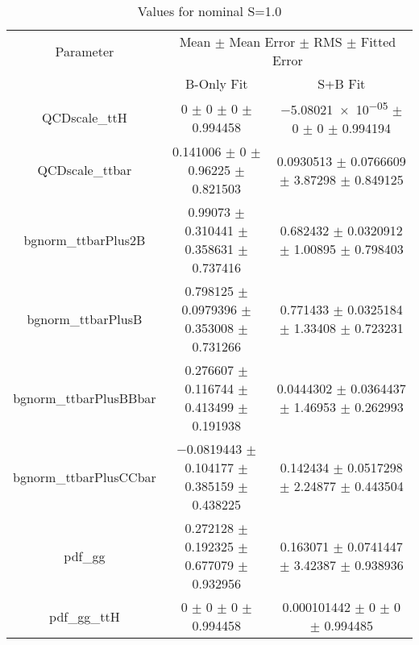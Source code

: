 \begin{table}
\centering
\caption{Values for nominal S=1.0}
\begin{tabular}{ccc}
\toprule
Parameter & \multicolumn{2}{c}{Mean $\pm$ Mean Error $\pm$ RMS $\pm$ Fitted Error}\\
 & B-Only Fit & S+B Fit\\
\midrule
QCDscale\_ttH & \num{0} $\pm$ \num{0} $\pm$ \num{0} $\pm$ \num{0.994458} & \num{-5.08021e-05} $\pm$ \num{0} $\pm$ \num{0} $\pm$ \num{0.994194}\\
QCDscale\_ttbar & \num{0.141006} $\pm$ \num{0} $\pm$ \num{0.96225} $\pm$ \num{0.821503} & \num{0.0930513} $\pm$ \num{0.0766609} $\pm$ \num{3.87298} $\pm$ \num{0.849125}\\
bgnorm\_ttbarPlus2B & \num{0.99073} $\pm$ \num{0.310441} $\pm$ \num{0.358631} $\pm$ \num{0.737416} & \num{0.682432} $\pm$ \num{0.0320912} $\pm$ \num{1.00895} $\pm$ \num{0.798403}\\
bgnorm\_ttbarPlusB & \num{0.798125} $\pm$ \num{0.0979396} $\pm$ \num{0.353008} $\pm$ \num{0.731266} & \num{0.771433} $\pm$ \num{0.0325184} $\pm$ \num{1.33408} $\pm$ \num{0.723231}\\
bgnorm\_ttbarPlusBBbar & \num{0.276607} $\pm$ \num{0.116744} $\pm$ \num{0.413499} $\pm$ \num{0.191938} & \num{0.0444302} $\pm$ \num{0.0364437} $\pm$ \num{1.46953} $\pm$ \num{0.262993}\\
bgnorm\_ttbarPlusCCbar & \num{-0.0819443} $\pm$ \num{0.104177} $\pm$ \num{0.385159} $\pm$ \num{0.438225} & \num{0.142434} $\pm$ \num{0.0517298} $\pm$ \num{2.24877} $\pm$ \num{0.443504}\\
pdf\_gg & \num{0.272128} $\pm$ \num{0.192325} $\pm$ \num{0.677079} $\pm$ \num{0.932956} & \num{0.163071} $\pm$ \num{0.0741447} $\pm$ \num{3.42387} $\pm$ \num{0.938936}\\
pdf\_gg\_ttH & \num{0} $\pm$ \num{0} $\pm$ \num{0} $\pm$ \num{0.994458} & \num{0.000101442} $\pm$ \num{0} $\pm$ \num{0} $\pm$ \num{0.994485}\\
\bottomrule
\end{tabular}
\end{table}
